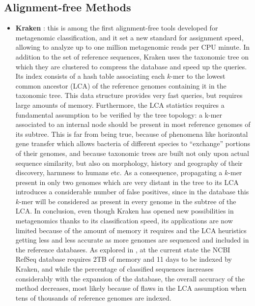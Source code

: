 \subsection{Alignment-free Methods}
\begin{itemize}
    \item \textbf{Kraken} \cite{wood_kraken:_2014}: this is among the first alignment-free tools developed for metagenomic classification, and it set a new standard for assignment speed, allowing to analyze up to one million metagenomic reads per CPU minute. In addition to the set of reference sequences, Kraken uses the taxonomic tree on which they are clustered to compress the database and speed up the queries. Its index consists of a hash table associating each $k$-mer to the lowest common ancestor (LCA) of the reference genomes containing it in the taxonomic tree. This data structure provides very fast queries, but requires large amounts of memory. Furthermore, the LCA statistics requires a fundamental assumption to be verified by the tree topology: a k-mer associated to an internal node should be present in most reference genomes of its subtree. This is far from being true, because of phenomena like horizontal gene transfer which allows bacteria of different species to ``exchange'' portions of their genomes, and because taxonomic trees are built not only upon actual sequence similarity, but also on morphology, history and geography of their discovery, harmness to humans etc. As a consequence, propagating a $k$-mer present in only two genomes which are very distant in the tree to its LCA introduces a considerable number of false positives, since in the database this $k$-mer will be considered as present in every genome in the subtree of the LCA. In conclusion, even though Kraken has opened new possibilities in metagenomics thanks to its classification speed, its applications are now limited because of the amount of memory it requires and the LCA heuristics getting less and less accurate as more genomes are sequenced and included in the reference databases. As explored in \cite{nasko_refseq_2018}, at the current state the NCBI RefSeq database requires 2TB of memory and 11 days to be indexed by Kraken, and while the percentage of classified sequences increases considerably with the expansion of the database, the overall accuracy of the method decreases, most likely because of flaws in the LCA assumption when tens of thousands of reference genomes are indexed.

\end{itemize}
